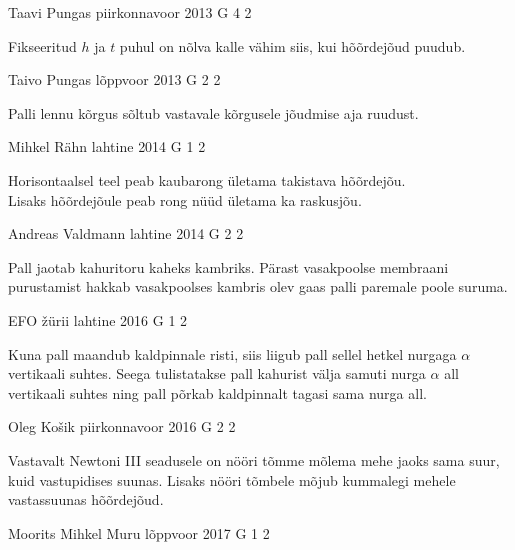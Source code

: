 \documentclass[11pt]{article}
\begin{document}
{%
{Taavi Pungas} %
{piirkonnavoor} %
{2013} %
{G 4} %
{2} %
{

\ifHint
Fikseeritud $h$ ja $t$ puhul on nõlva kalle vähim siis, kui hõõrdejõud puudub.
\fi
}

{Taivo Pungas} %
{lõppvoor} %
{2013} %
{G 2} %
{2} %
{

\ifHint
Palli lennu kõrgus sõltub vastavale kõrgusele jõudmise aja ruudust.
\fi
}

{Mihkel Rähn} %
{lahtine} %
{2014} %
{G 1} %
{2} %
{

\ifHint
\osa Horisontaalsel teel peab kaubarong ületama takistava hõõrdejõu.\\
\osa Lisaks hõõrdejõule peab rong nüüd ületama ka raskusjõu.
\fi
}

{Andreas Valdmann} %
{lahtine} %
{2014} %
{G 2} %
{2} %
{

\ifHint
Pall jaotab kahuritoru kaheks kambriks. Pärast vasakpoolse membraani purustamist hakkab vasakpoolses kambris olev gaas palli paremale poole suruma.
\fi
}

{EFO žürii} %
{lahtine} %
{2016} %
{G 1} %
{2} %
{

\ifHint
Kuna pall maandub kaldpinnale risti, siis liigub pall sellel hetkel nurgaga $\alpha$ vertikaali suhtes. Seega tulistatakse pall kahurist välja samuti nurga $\alpha$ all vertikaali suhtes ning pall põrkab kaldpinnalt tagasi sama nurga all.
\fi
}

{Oleg Košik} %
{piirkonnavoor} %
{2016} %
{G 2} %
{2} %
{

\ifHint
Vastavalt Newtoni III seadusele on nööri tõmme mõlema mehe jaoks sama suur, kuid vastupidises suunas. Lisaks nööri tõmbele mõjub kummalegi mehele vastassuunas hõõrdejõud.
\fi
}

{Moorits Mihkel Muru} %
{lõppvoor} %
{2017} %
{G 1} %
{2} %
{

}}
\end{document}
